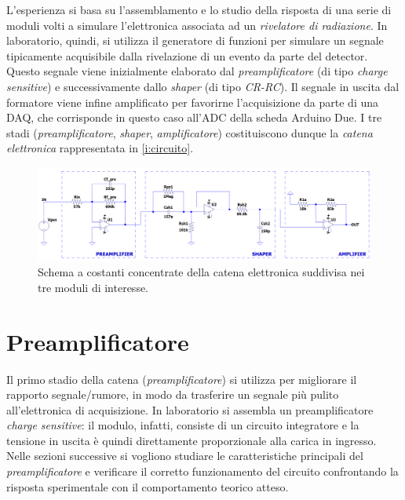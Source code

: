 \documentclass[a4paper,11pt]{article} %
\begin{document}
L'esperienza si basa su l'assemblamento e lo studio della risposta di una serie di moduli volti a simulare l'elettronica
associata ad un \textit{rivelatore di radiazione}. In laboratorio, quindi, si utilizza il generatore di funzioni per
simulare un segnale tipicamente acquisibile dalla rivelazione di un evento da parte del detector. Questo segnale viene
inizialmente elaborato dal \textit{preamplificatore} (di tipo \textit{charge sensitive}) e successivamente dallo
\textit{shaper} (di tipo \textit{CR-RC}). Il segnale in uscita dal formatore viene infine amplificato per favorirne
l'acquisizione da parte di una DAQ, che corrisponde in questo caso all'ADC della scheda Arduino Due. I tre stadi
(\textit{preamplificatore}, \textit{shaper}, \textit{amplificatore}) costituiscono dunque la \textit{catena elettronica}
rappresentata in \autoref{i:circuito}.

\begin{figure}[H]
	\centering
	\includegraphics[width=0.9\linewidth]{../Simulations/catena_circuito.png}
	\caption{\small Schema a costanti concentrate della catena elettronica suddivisa nei tre moduli di interesse.}
	\label{i:circuito}
\end{figure}



\section{Preamplificatore}\label{s:preamp} 

Il primo stadio della catena (\textit{preamplificatore}) si utilizza per migliorare il rapporto segnale/rumore, in modo
da trasferire un segnale più pulito all'elettronica di acquisizione. In laboratorio si assembla un preamplificatore
\textit{charge sensitive}: il modulo, infatti, consiste di un circuito integratore e la tensione in uscita è quindi
direttamente proporzionale alla carica in ingresso. Nelle sezioni successive si vogliono studiare le caratteristiche
principali del \textit{preamplificatore} e verificare il corretto funzionamento del circuito confrontando la risposta
sperimentale con il comportamento teorico atteso.
\end{document}
